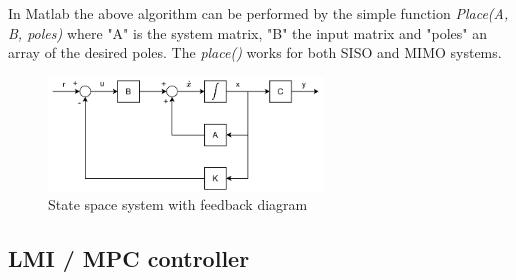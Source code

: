 In Matlab the above algorithm can be performed by the simple function \textit{Place(A, B, poles)} where "A" is the system matrix, "B" the input matrix and "poles" an array of the desired poles. The \textit{place()} works for both SISO and MIMO systems.

\begin{figure}[h!]
	\centering
	\includegraphics[width=0.65\textwidth]{Graphics/State_space_feedback.pdf}
	\caption{State space system with feedback diagram}
	\label{fig:state_space_fb}
\end{figure}






\subsection{LMI / MPC controller}
